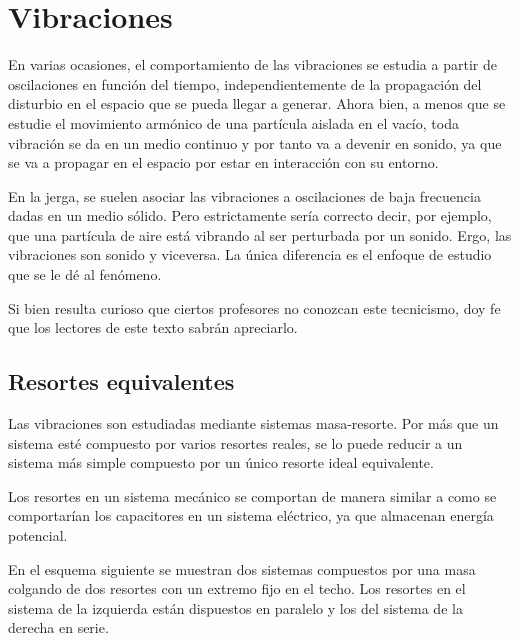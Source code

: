 \chapter{Vibraciones}

\begin{mdframed}[style=DefinitionFrame]
    \begin{defn}
    \end{defn}
\end{mdframed}

En varias ocasiones, el comportamiento de las vibraciones se estudia a partir de oscilaciones en función del tiempo, independientemente de la propagación del disturbio en el espacio que se pueda llegar a generar.
Ahora bien, a menos que se estudie el movimiento armónico de una partícula aislada en el vacío, toda vibración se da en un medio continuo y por tanto va a devenir en sonido, ya que se va a propagar en el espacio por estar en interacción con su entorno.

En la jerga, se suelen asociar las vibraciones a oscilaciones de baja frecuencia dadas en un medio sólido.
Pero estrictamente sería correcto decir, por ejemplo, que una partícula de aire está vibrando al ser perturbada por un sonido.
Ergo, las vibraciones son sonido y viceversa.
La única diferencia es el enfoque de estudio que se le dé al fenómeno.

Si bien resulta curioso que ciertos profesores no conozcan este tecnicismo, doy fe que los lectores de este texto sabrán apreciarlo.

\section{Resortes equivalentes}

Las vibraciones son estudiadas mediante sistemas masa-resorte.
Por más que un sistema esté compuesto por varios resortes reales, se lo puede reducir a un sistema más simple compuesto por un único resorte ideal equivalente.

Los resortes en un sistema mecánico se comportan de manera similar a como se comportarían los capacitores en un sistema eléctrico, ya que almacenan energía potencial.

En el esquema siguiente se muestran dos sistemas compuestos por una masa colgando de dos resortes con un extremo fijo en el techo.
Los resortes en el sistema de la izquierda están dispuestos en paralelo y los del sistema de la derecha en serie.

